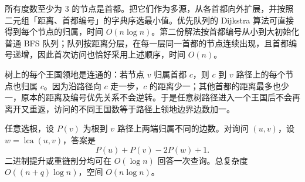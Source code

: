 \Legend
所有度数至少为 $3$ 的节点是首都。把它们作为多源，从各首都向外扩展，并按照二元组「距离、首都编号」的字典序选最小值。优先队列的 Dijkstra 算法可直接得到每个节点的归属，时间 $O(n\log n)$。第二份解法按首都编号从小到大初始化普通 BFS 队列；队列按距离分层，在每一层同一首都的节点连续出现，且首都编号递增，因此首次访问也恰好采用上述顺序，时间 $O(n)$。

树上的每个王国领地是连通的：若节点 $v$ 归属首都 $c$，则 $c$ 到 $v$ 路径上的每个节点也归属 $c$。因为沿路径向 $c$ 走一步，$c$ 的距离少一；其他首都的距离最多也少一，原本的距离及编号优先关系不会逆转。于是任意树路径进入一个王国后不会再离开又重返，访问的不同王国数等于路径上领地边界边数加一。

任意选根，设 $P(v)$ 为根到 $v$ 路径上两端归属不同的边数。对询问 $(u,v)$，设 $w=\operatorname{lca}(u,v)$，答案是
$$
P(u)+P(v)-2P(w)+1.
$$
二进制提升或重链剖分均可在 $O(\log n)$ 回答一次查询。总复杂度 $O((n+q)\log n)$，空间 $O(n\log n)$。
